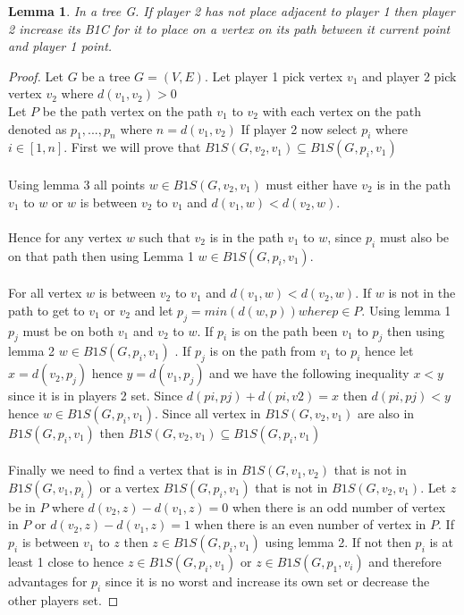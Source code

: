 \documentclass{article}
\newtheorem{lemma}{Lemma}
\begin{document}
\begin{lemma}
In a tree G. If player 2 has not place adjacent to player 1 then player 2 increase its B1C for it to place on a vertex on its path between it current point and player 1 point.
\end{lemma}

\begin{proof}
Let \(G\) be a tree \( G=(V,E)\). Let player 1 pick vertex \(v_1 \) and player 2 pick vertex  \(v_2\) where \(d(v_1,v_2)>0\) 
\\ 
Let \(P\) be the path vertex on the path \( v_1 \) to \( v_2 \) with each vertex on the path denoted as \(p_1,...,p_n \) where \(n = d(v_1,v_2)\) If player 2 now select \( p_i\) where \( i \in [1,n]\). First we will prove that \(B1S(G,v_2, v_1) \subseteq B1S(G,p_i, v_1) \)
\\ \\
Using lemma 3 all points \(w\in B1S(G,v_2, v_1)\) must either have \( v_2 \) is in the path \(v_1\) to \( w \)  or \( w \) is between \(v_2\) to \(v_1\) and \(d(v_1,w)<d(v_2,w)\). 
\\ \\
Hence for any vertex \(w\) such that \( v_2 \) is in the path \(v_1\) to \( w \), since \(p_i\) must also be on that path then using Lemma 1 \(w \in B1S(G,p_i, v_1) \). 
\\ \\
For all vertex \( w \) is between \(v_2\) to \(v_1\) and \(d(v_1,w)<d(v_2,w)\). If \( w \) is not in the path to get to \(v_1\) or \(v_2\) and let \(p_j = min(d(w,p)) where p \in P\). Using lemma 1 \(p_j\) must be on both \(v_1\) and \(v_2\) to \(w\). If \(p_i\)  is on the path been \(v_1\) to \(p_j\) then using lemma 2 \(w \in B1S(G,p_i, v_1)\) . If \(p_j\) is on the path from \(v_1\) to \(p_i\) hence let \(x = d(v_2,p_j)\) hence \(y=d(v_1,p_j)\) and we have the following inequality \(x<y\) since it is in players 2 set. Since \(d(pi,pj) + d(pi,v2)=x\) then  \(d(pi,pj)<y\) hence \(w \in B1S(G,p_i, v_1)\). Since all vertex in \(B1S(G,v_2, v_1)\) are also in \( B1S(G,p_i, v_1) \) then \(B1S(G,v_2, v_1) \subseteq B1S(G,p_i, v_1) \)
\\ \\
Finally we need to find a vertex that is in \(B1S(G,v_1, v_2)\) that is not in \(B1S(G,v_1, p_i)\) or a vertex \(B1S(G,p_i, v_1)\) that is not in \(B1S(G,v_2, v_1)\). Let \(z\) be in \( P\) where \(d(v_2,z) - d(v_1,z) = 0\) when there is an odd number of vertex in \( P\) or \(d(v_2,z) - d(v_1,z) = 1\) when there is an even number of vertex in \( P\). If \(p_i\) is between \(v_1\) to \(z\) then \(z \in B1S(G,p_i, v_1)\) using lemma 2. If not then \(p_i\) is at least 1 close to hence \(z \in B1S(G,p_i, v_1)\) or \(z \in B1S(G,p_1, v_i)\) and therefore advantages for \(p_i\) since it is no worst and increase its own set or decrease the other players set.


\end{proof}
\end{document}
